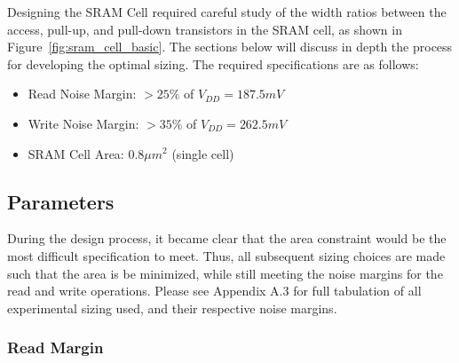 \documentclass[10pt,letterpaper,onecolumn]{article}
\begin{document}
Designing the SRAM Cell required careful study of the width ratios between the access, pull-up, and pull-down transistors in the SRAM cell, as shown in Figure~\ref{fig:sram_cell_basic}. The sections below will discuss in depth the process for developing the optimal sizing. The required specifications are as follows:
\begin{itemize}
  \item Read Noise Margin: $>25\%$ of $V_{DD} = 187.5mV$
  \item Write Noise Margin: $>35\%$ of $V_{DD} = 262.5mV$
  \item SRAM Cell Area: $0.8\mu m^2$ (single cell)
\end{itemize}


\subsection{Parameters}

During the design process, it became clear that the area constraint would be the most difficult specification to meet. Thus, all subsequent sizing choices are made such that the area is be minimized, while still meeting the noise margins for the read and write operations. Please see Appendix A.3 for full tabulation of all experimental sizing used, and their respective noise margins.

\subsubsection{Read Margin}
\end{document}
